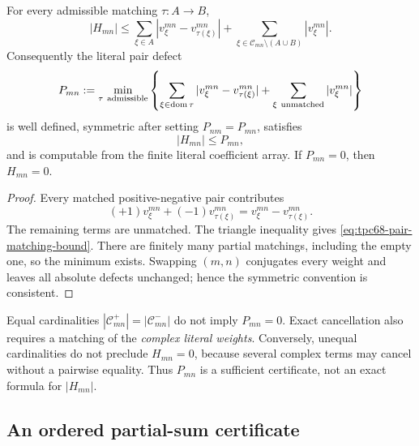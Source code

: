 \begin{theorem}
\label{thm:tpc68-pair-certificate}
For every admissible matching \(\tau:A\to B\),
\begin{equation}
 |H_{mn}|
 \le
 \sum_{\xi\in A}|v_\xi^{mn}-v_{\tau(\xi)}^{mn}|
 +\sum_{\xi\in\mathcal C_{mn}\setminus(A\cup B)}
 |v_\xi^{mn}|.
 \label{eq:tpc68-pair-matching-bound}
\end{equation}
Consequently the literal pair defect
\begin{equation}
 P_{mn}
 :=
 \min_{\tau\ {\rm admissible}}
 \left\{
 \sum_{\xi\in\operatorname{dom}\tau}
 |v_\xi^{mn}-v_{\tau(\xi)}^{mn}|
 +
 \sum_{\xi\ {\rm unmatched}}|v_\xi^{mn}|
 \right\}
 \label{eq:tpc68-optimal-pair-defect}
\end{equation}
is well defined, symmetric after setting \(P_{nm}=P_{mn}\), satisfies
\begin{equation}
 |H_{mn}|\le P_{mn},
 \label{eq:tpc68-entry-below-defect}
\end{equation}
and is computable from the finite literal coefficient array.  If
\(P_{mn}=0\), then \(H_{mn}=0\).
\end{theorem}

\begin{proof}
Every matched positive-negative pair contributes
\[
 (+1)v_\xi^{mn}+(-1)v_{\tau(\xi)}^{mn}
 =v_\xi^{mn}-v_{\tau(\xi)}^{mn}.
\]
The remaining terms are unmatched.  The triangle inequality gives
\eqref{eq:tpc68-pair-matching-bound}.  There are finitely many partial
matchings, including the empty one, so the minimum exists.  Swapping
\((m,n)\) conjugates every weight and leaves all absolute defects
unchanged; hence the symmetric convention is consistent.
\end{proof}

\begin{remark}
Equal cardinalities
\(|\mathcal C_{mn}^{+}|=|\mathcal C_{mn}^{-}|\) do not imply
\(P_{mn}=0\).  Exact cancellation also requires a matching of the
\emph{complex literal weights}.  Conversely, unequal cardinalities do not
preclude \(H_{mn}=0\), because several complex terms may cancel without a
pairwise equality.  Thus \(P_{mn}\) is a sufficient certificate, not an
exact formula for \(|H_{mn}|\).
\end{remark}

\subsection{An ordered partial-sum certificate}

